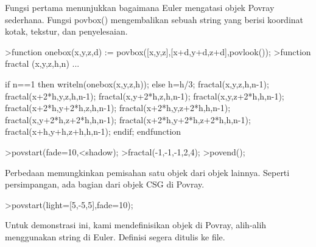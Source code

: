\begin{eulercomment}
\begin{eulercomment}
Fungsi pertama menunjukkan bagaimana Euler mengatasi objek Povray
sederhana. Fungsi povbox() mengembalikan sebuah string yang berisi
koordinat kotak, tekstur, dan penyelesaian.
\end{eulercomment}
\begin{eulerprompt}
>function onebox(x,y,z,d) := povbox([x,y,z],[x+d,y+d,z+d],povlook());
>function fractal (x,y,z,h,n) ...
\end{eulerprompt}
\begin{eulerudf}
   if n==1 then writeln(onebox(x,y,z,h));
   else
     h=h/3;
     fractal(x,y,z,h,n-1);
     fractal(x+2*h,y,z,h,n-1);
     fractal(x,y+2*h,z,h,n-1);
     fractal(x,y,z+2*h,h,n-1);
     fractal(x+2*h,y+2*h,z,h,n-1);
     fractal(x+2*h,y,z+2*h,h,n-1);
     fractal(x,y+2*h,z+2*h,h,n-1);
     fractal(x+2*h,y+2*h,z+2*h,h,n-1);
     fractal(x+h,y+h,z+h,h,n-1);
   endif;
  endfunction
\end{eulerudf}
\begin{eulerprompt}
>povstart(fade=10,<shadow);
>fractal(-1,-1,-1,2,4);
>povend();
\end{eulerprompt}
\begin{eulercomment}
Perbedaan memungkinkan pemisahan satu objek dari objek lainnya.
Seperti persimpangan, ada bagian dari objek CSG di Povray.
\end{eulercomment}
\begin{eulerprompt}
>povstart(light=[5,-5,5],fade=10);
\end{eulerprompt}
\begin{eulercomment}
Untuk demonstrasi ini, kami mendefinisikan objek di Povray, alih-alih
menggunakan string di Euler. Definisi segera ditulis ke file.


\end{eulercomment}
\end{eulercomment}
